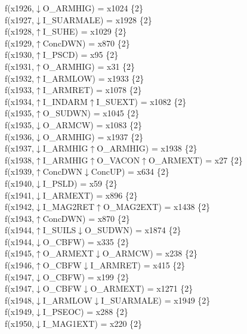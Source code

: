 f(x1926,$\downarrow$O\_ARMHIG) = x1024 \{2\} \\  
f(x1927,$\downarrow$I\_SUARMALE) = x1928 \{2\} \\  
f(x1928,$\uparrow$I\_SUHE) = x1029 \{2\} \\  
f(x1929,$\uparrow$ConcDWN) = x870 \{2\} \\  
f(x1930,$\uparrow$I\_PSCD) = x95 \{2\} \\  
f(x1931,$\uparrow$O\_ARMHIG) = x31 \{2\} \\  
f(x1932,$\uparrow$I\_ARMLOW) = x1933 \{2\} \\  
f(x1933,$\uparrow$I\_ARMRET) = x1078 \{2\} \\  
f(x1934,$\uparrow$I\_INDARM$\uparrow$I\_SUEXT) = x1082 \{2\} \\  
f(x1935,$\uparrow$O\_SUDWN) = x1045 \{2\} \\  
f(x1935,$\downarrow$O\_ARMCW) = x1083 \{2\} \\  
f(x1936,$\downarrow$O\_ARMHIG) = x1937 \{2\} \\  
f(x1937,$\downarrow$I\_ARMHIG$\uparrow$O\_ARMHIG) = x1938 \{2\} \\  
f(x1938,$\uparrow$I\_ARMHIG$\uparrow$O\_VACON$\uparrow$O\_ARMEXT) = x27 \{2\} \\  
f(x1939,$\uparrow$ConcDWN$\downarrow$ConcUP) = x634 \{2\} \\  
f(x1940,$\downarrow$I\_PSLD) = x59 \{2\} \\  
f(x1941,$\downarrow$I\_ARMEXT) = x896 \{2\} \\  
f(x1942,$\downarrow$I\_MAG2RET$\uparrow$O\_MAG2EXT) = x1438 \{2\} \\  
f(x1943,$\uparrow$ConcDWN) = x870 \{2\} \\  
f(x1944,$\uparrow$I\_SUILS$\downarrow$O\_SUDWN) = x1874 \{2\} \\  
f(x1944,$\downarrow$O\_CBFW) = x335 \{2\} \\  
f(x1945,$\uparrow$O\_ARMEXT$\downarrow$O\_ARMCW) = x238 \{2\} \\  
f(x1946,$\uparrow$O\_CBFW$\downarrow$I\_ARMRET) = x415 \{2\} \\  
f(x1947,$\downarrow$O\_CBFW) = x199 \{2\} \\  
f(x1947,$\downarrow$O\_CBFW$\downarrow$O\_ARMEXT) = x1271 \{2\} \\  
f(x1948,$\downarrow$I\_ARMLOW$\downarrow$I\_SUARMALE) = x1949 \{2\} \\  
f(x1949,$\downarrow$I\_PSEOC) = x288 \{2\} \\  
f(x1950,$\downarrow$I\_MAG1EXT) = x220 \{2\} \\  
